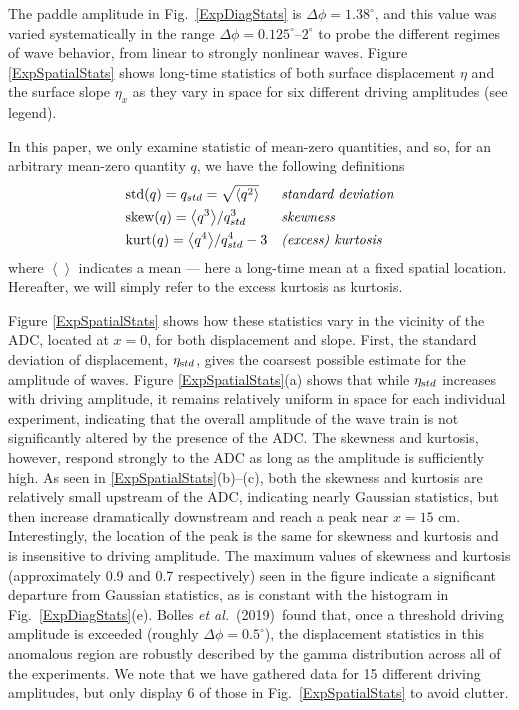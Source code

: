 \documentclass[11pt]{article}
\newcommand{\new}[1]{{ #1}}
\newcommand{\mean}[1]{\left< #1 \right>}
\newcommand{\etastd}{\eta_{\text std}}
\newcommand{\Dphi}{\Delta \phi}
\newcommand{\skw}{\text{skew}}
\newcommand{\var}{\text{var}}
\newcommand{\kurt}{\text{kurt}}
\newcommand{\std}{\text{std}}
\newcommand{\boetal}{Bolles {\it et al.}~(2019)~}
\begin{document}
The paddle amplitude in Fig.~\ref{ExpDiagStats} is $\Dphi = 1.38^{\circ}$, and this value was varied systematically in the range $\Dphi = 0.125^{\circ}$--$2^{\circ}$ to probe the different regimes of wave behavior, from linear to strongly nonlinear waves. Figure \ref{ExpSpatialStats} shows long-time statistics of both surface displacement $\eta$ and the surface slope $\eta_x$ as they vary in space for six different driving amplitudes (see legend). 

In this paper, we only examine statistic of mean-zero quantities, and so, for an arbitrary mean-zero quantity $q$, we have the following definitions
\begin{align}
& \std(q) = q_{std}= \sqrt{\mean{q^2}}
&&\mbox{\em standard deviation} \\
& \skw(q) = {\mean{q^3}} / {q_{std}^3}	
&&\mbox{\em skewness} \\
& \kurt(q) = {\mean{q^4}} / {q_{std}^4} - 3
&&\mbox{\em (excess) kurtosis}
\end{align}
where $\mean{}$ indicates a mean --- here a long-time mean at a fixed spatial location. Hereafter, we will simply refer to the excess kurtosis as kurtosis.
  
	Figure \ref{ExpSpatialStats} shows how these statistics vary in the vicinity of the ADC, located at $x = 0$, for both displacement and slope. First, the standard deviation of displacement, $\etastd$, gives the coarsest possible estimate for the amplitude of waves. Figure \ref{ExpSpatialStats}(a) shows that while $\etastd$ increases with driving amplitude, it remains relatively uniform in space for each individual experiment, indicating that the overall amplitude of the wave train is not significantly altered by the presence of the ADC. The skewness and kurtosis, however, respond strongly to the ADC as long as the amplitude is sufficiently high. As seen in \ref{ExpSpatialStats}(b)--(c), both the skewness and kurtosis are relatively small upstream of the ADC, indicating nearly Gaussian statistics, but then increase dramatically downstream and reach a peak near $x = 15$ cm. Interestingly, the location of the peak is the same for skewness and kurtosis and \new{is} insensitive to driving amplitude. The maximum values of skewness and kurtosis (approximately 0.9 and 0.7 respectively) seen in the figure indicate a significant departure from Gaussian statistics, as is constant with the histogram in Fig.~\ref{ExpDiagStats}(e). \boetal found that, once a threshold driving amplitude is exceeded (roughly $\Dphi = 0.5^{\circ}$), the displacement statistics in this anomalous region are robustly described by the gamma distribution across all of the experiments. We note that we have gathered data for 15 different driving amplitudes, but only display 6 of those in Fig.~\ref{ExpSpatialStats} to avoid clutter. 
 
\end{document}
